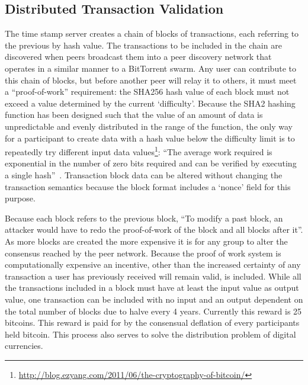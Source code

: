 \subsection{Distributed Transaction Validation}
The time stamp server creates a chain of blocks of transactions, each referring to the previous by hash value.  The transactions to be included in the chain are discovered when peers broadcast them into a peer discovery network that operates in a similar manner to a BitTorrent swarm.  Any user can contribute to this chain of blocks, but before another peer will relay it to others, it must meet a ``proof-of-work'' requirement: the SHA256 hash value of each block must not exceed a value determined by the current `difficulty'.  Because the SHA2 hashing function has been designed such that the value of an amount of data is unpredictable and evenly distributed in the range of the function, the only way for a participant to create data with a hash value below the difficulty limit is to repeatedly try different input data values\footnote{\url{http://blog.ezyang.com/2011/06/the-cryptography-of-bitcoin/}}: ``The average work required is exponential in the number of zero bits required and can be verified by executing a single hash''~\cite{satoshi}. Transaction block data can be altered without changing the transaction semantics because the block format includes a `nonce' field for this purpose.


Because each block refers to the previous block, ``To modify a past block, an attacker would have to redo the proof-of-work of the block and all blocks after it''.  As more blocks are created the more expensive it is for any group to alter the consensus reached by the peer network.  Because the proof of work system is computationally expensive an incentive, other than the increased certainty of any transaction a user has previously received will remain valid, is included.  While all the transactions included in a block must have at least the input value as output value, one transaction can be included with no input and an output dependent on the total number of blocks due to halve every 4 years. Currently this reward is 25 bitcoins. This reward is paid for by the consensual deflation of every participants held bitcoin. This process also serves to solve the distribution problem of digital currencies.

